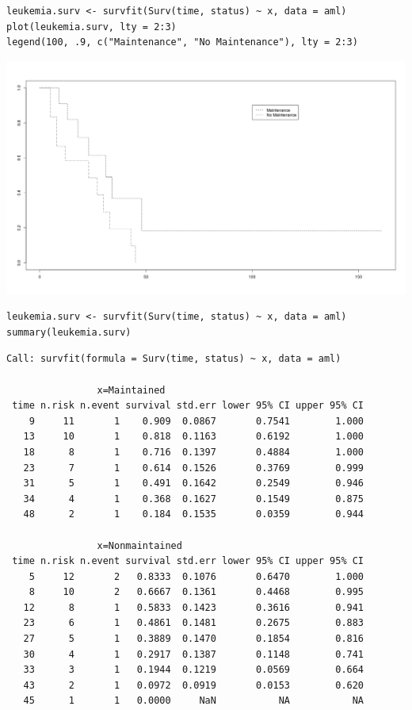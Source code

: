 \documentclass[11pt]{article}
\begin{document}
\begin{verbatim}
leukemia.surv <- survfit(Surv(time, status) ~ x, data = aml)
plot(leukemia.surv, lty = 2:3)
legend(100, .9, c("Maintenance", "No Maintenance"), lty = 2:3)
\end{verbatim}

\begin{center}
\includegraphics[width=.9\linewidth]{leukemia.png}
\end{center}

\begin{verbatim}
leukemia.surv <- survfit(Surv(time, status) ~ x, data = aml)
summary(leukemia.surv)
\end{verbatim}

\begin{verbatim}
Call: survfit(formula = Surv(time, status) ~ x, data = aml)

                x=Maintained 
 time n.risk n.event survival std.err lower 95% CI upper 95% CI
    9     11       1    0.909  0.0867       0.7541        1.000
   13     10       1    0.818  0.1163       0.6192        1.000
   18      8       1    0.716  0.1397       0.4884        1.000
   23      7       1    0.614  0.1526       0.3769        0.999
   31      5       1    0.491  0.1642       0.2549        0.946
   34      4       1    0.368  0.1627       0.1549        0.875
   48      2       1    0.184  0.1535       0.0359        0.944

                x=Nonmaintained 
 time n.risk n.event survival std.err lower 95% CI upper 95% CI
    5     12       2   0.8333  0.1076       0.6470        1.000
    8     10       2   0.6667  0.1361       0.4468        0.995
   12      8       1   0.5833  0.1423       0.3616        0.941
   23      6       1   0.4861  0.1481       0.2675        0.883
   27      5       1   0.3889  0.1470       0.1854        0.816
   30      4       1   0.2917  0.1387       0.1148        0.741
   33      3       1   0.1944  0.1219       0.0569        0.664
   43      2       1   0.0972  0.0919       0.0153        0.620
   45      1       1   0.0000     NaN           NA           NA
\end{verbatim}
\end{document}
